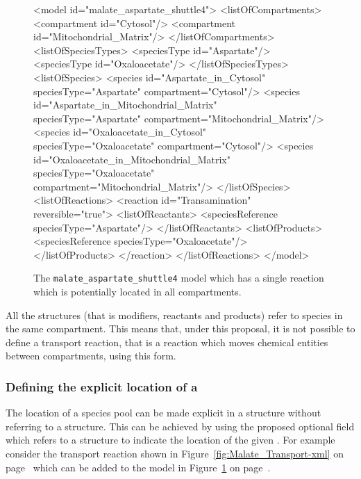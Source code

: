 \documentclass{cekarticle}
\begin{document}
\begin{figure}[h]
\begin{example}
<model id="malate_aspartate_shuttle4">
    <listOfCompartments>
        <compartment id="Cytosol"/>
        <compartment id="Mitochondrial_Matrix"/>
    </listOfCompartments>
    <listOfSpeciesTypes>
        <speciesType id="Aspartate"/>
        <speciesType id="Oxaloacetate"/>
    </listOfSpeciesTypes>
    <listOfSpecies>
        <species
            id="Aspartate_in_Cytosol"
            speciesType="Aspartate"
            compartment="Cytosol"/>
        <species
            id="Aspartate_in_Mitochondrial_Matrix"
            speciesType="Aspartate"
            compartment="Mitochondrial_Matrix"/>
        <species
            id="Oxaloacetate_in_Cytosol"
            speciesType="Oxaloacetate"
            compartment="Cytosol"/>
        <species
            id="Oxaloacetate_in_Mitochondrial_Matrix"
            speciesType="Oxaloacetate"
            compartment="Mitochondrial_Matrix"/>
    </listOfSpecies>
    <listOfReactions>
        <reaction id="Transamination" reversible="true">
            <listOfReactants>
                <speciesReference speciesType="Aspartate"/>
            </listOfReactants>
            <listOfProducts>
                <speciesReference speciesType="Oxaloacetate"/>
            </listOfProducts>
        </reaction>
    </listOfReactions>
</model>
\end{example}
\caption{The \texttt{malate\_aspartate\_shuttle4} model which has a single reaction which is potentially
located in all compartments.}
\label{fig:malate_aspartate_shuttle4-xml}
\end{figure}

All the  structures (that is
modifiers, reactants and products) refer to species in the same
compartment.  This means that, under this proposal, it is not
possible to define a transport reaction, that is a reaction which
moves chemical entities between compartments, using this form.

\subsubsection{Defining the explicit location of a }
\label{sec:locatedspeciesreferences}

The location of a species pool can be made explicit in a
 structure without referring to a
 structure.  This can be achieved by using the
proposed optional  field which refers to a
 structure to indicate the location of the
given . For example consider the transport
reaction shown in Figure~\ref{fig:Malate_Transport-xml} on
page~\pageref{fig:Malate_Transport-xml} which can be added to the
model in Figure~\ref{fig:malate_aspartate_shuttle4-xml} on
page~\pageref{fig:malate_aspartate_shuttle4-xml}.
\end{document}
